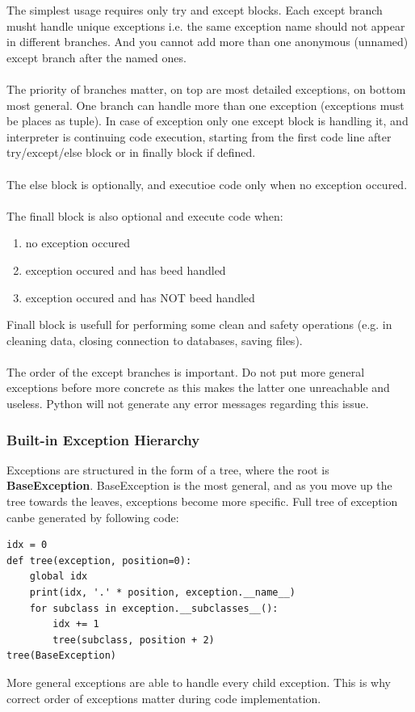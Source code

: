 \documentclass{article}
\begin{document}
The simplest usage requires only try and except blocks. Each except branch musht handle unique exceptions i.e. the same exception name should not appear in different branches. And you cannot add more than one anonymous (unnamed) except branch after the named ones.
\paragraph{}
The priority of branches matter, on top are most detailed exceptions, on bottom most general. One branch can handle more than one exception (exceptions must be places as tuple). In case of exception only one except block is handling it, and interpreter is continuing code execution, starting from the first code line after try/except/else block or in finally block if defined. 
\paragraph{}
The else block is optionally, and executioe code only when no exception occured. 
\paragraph{}
The finall block is also optional and execute code when:
\begin{enumerate}
\item no exception occured
\item exception occured and has beed handled
\item exception occured and has NOT beed handled
\end{enumerate}
Finall block is usefull for performing some clean and safety operations (e.g. in cleaning data, closing connection to databases, saving files).
\paragraph{}
The order of the except branches is important. Do not put more general exceptions before more concrete as this makes the latter one unreachable and useless. Python will not generate any error messages regarding this issue.

\subsubsection{Built-in Exception Hierarchy}
Exceptions are structured in the form of a tree, where the root is \textbf{BaseException}. BaseException is the most general, and as you move up the tree towards the leaves, exceptions become more specific. Full tree of exception canbe generated by following code:
\begin{lstlisting}[style=pystyle]
idx = 0
def tree(exception, position=0):
    global idx
    print(idx, '.' * position, exception.__name__)
    for subclass in exception.__subclasses__():
        idx += 1
        tree(subclass, position + 2)
tree(BaseException)
\end{lstlisting}
More general exceptions are able to handle every child exception. This is why correct order of exceptions matter during code implementation.
\end{document}
